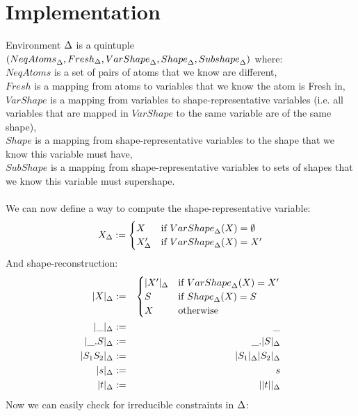 \documentclass[english, mgr]{iithesis}
\begin{document}
\section{Implementation}
Environment $\Delta$ is a quintuple
$({NeqAtoms}_{\Delta}
, {Fresh}_{\Delta}
, {VarShape}_{\Delta}
, {Shape}_{\Delta}
, {Subshape}_{\Delta}
)$ where: \\
$NeqAtoms$ is a set of pairs of atoms that we know are different, \\
$Fresh$ is a mapping from atoms to variables that we know the atom is {Fresh} in,\\
$VarShape$ is a mapping from variables to shape-representative variables (i.e. all variables that are mapped in $VarShape$ to the same variable are of the same shape),\\
$Shape$ is a mapping from shape-representative variables to the shape that we know this variable must have,\\
$SubShape$ is a mapping from shape-representative variables to sets of shapes that we know this variable must supershape.
\\
\\
\newcommand{\shrep}[2][\icEnv]{\ensuremath{ #2_{#1}}}
\newcommand{\shenv}[2][\icEnv]{\ensuremath{ |#2|_{#1}}}
We can now define a way to compute the shape-representative variable:
$$
\shrep{\termv} :=
     \begin{cases}
      \termv          &\text{if } {VarShape}_{\icEnv}(\termv) = \emptyset \\
       \shrep{\termv'} &\text{if } {VarShape}_{\icEnv}(\termv) = \termv'
     \end{cases}
$$
And shape-reconstruction:
\begin{eqnarray*}
  \shenv{\termv}                 &:=&
  \begin{cases}
    \shenv{\termv'} &\text{if } {VarShape}_{\icEnv}(\termv) = \termv' \\
    \shape          &\text{if } {Shape}_{\icEnv}(\termv) = \shape \\
    \termv          &\text{otherwise}
  \end{cases} \\
  \shenv{\shatom}           &:=& \shatom \\
  \shenv{\shbind \shape}    &:=& \shbind \shenv{\shape} \\
  \shenv{\shape_1 \shape_2} &:=& \shenv{\shape_1} \shenv{\shape_2}\\
  \shenv{\symb}             &:=& \symb \\
  \shenv{\term}             &:=& \shenv{|\term|}
\end{eqnarray*}
\newcommand{\occurs}[2]{\ensuremath{ {#1}\text{ occurs in }{#2}}}
\newcommand{\stxoccurs}[2]{\ensuremath{ {#1}\text{ occurs syntactically in }{#2}}}
\newcommand{\pluseq}{\mathrel{+}=}
\newcommand{\minuseq}{\mathrel{-}=}
Now we can easily check for irreducible constraints in $\Delta$:
\end{document}
